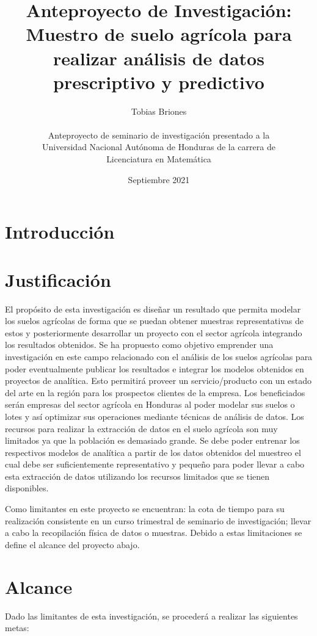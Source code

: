 \documentclass{report}
\title{Anteproyecto de Investigación: Muestro de suelo agrícola para realizar análisis de datos prescriptivo y predictivo}
\author{
Tobias Briones\\\\
Anteproyecto de seminario de investigación presentado a la\\
Universidad Nacional Autónoma de Honduras de la carrera de\\
Licenciatura en Matemática
}
\date{Septiembre 2021}
\begin{document}
\maketitle

\tableofcontents


\section{Introducción}


\section{Justificación}

El propósito de esta investigación es diseñar un resultado que permita modelar los suelos agrícolas de forma que se puedan obtener muestras representativas de estos y posteriormente desarrollar un proyecto con el sector agrícola integrando los resultados obtenidos. Se ha propuesto como objetivo emprender una investigación en este campo relacionado con el análisis de los suelos agrícolas para poder eventualmente publicar los resultados e integrar los modelos obtenidos en proyectos de analítica. Esto permitirá proveer un servicio/producto con un estado del arte en la región para los prospectos clientes de la empresa. Los beneficiados serán empresas del sector agrícola en Honduras al poder modelar sus suelos o lotes y así optimizar sus operaciones mediante técnicas de análisis de datos. Los recursos para realizar la extracción de datos en el suelo agrícola son muy limitados ya que la población es demasiado grande. Se debe poder entrenar los respectivos modelos de analítica a partir de los datos obtenidos del muestreo el cual debe ser suficientemente representativo y pequeño para poder llevar a cabo esta extracción de datos utilizando los recursos limitados que se tienen disponibles.

\bigbreak

Como limitantes en este proyecto se encuentran: la cota de tiempo para su realización consistente en un curso trimestral de seminario de investigación; llevar a cabo la recopilación física de datos o muestras. Debido a estas limitaciones se define el alcance del proyecto abajo.

\section{Alcance}

Dado las limitantes de esta investigación, se procederá a realizar las siguientes metas:
\end{document}
